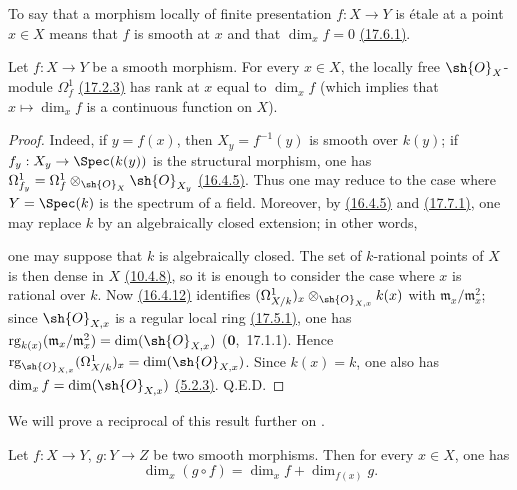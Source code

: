 To say that a morphism locally of finite presentation $f:X\to Y$ is \'etale at a point $x\in X$ means that $f$ is smooth at $x$ and that $\dim_x f=0$ {\hyperlink{ega4.c04.thm.17-6-1}{(17.6.1)}}.

\begin{proposition}[17.10.2]
\label{IV.17.10.2}
Let $f:X\to Y$ be a smooth morphism.
For every $x\in X$, the locally free $\sh{O}_X$-module $\Omega^1_f$ {\hyperlink{ega4.c04.prop.17-2-3}{(17.2.3)}} has rank at $x$ equal to $\dim_x f$ (which implies that $x\mapsto\dim_x f$ is a continuous function on $X$).
\end{proposition}

\begin{proof}
Indeed, if $y=f(x)$, then $X_y=f^{-1}(y)$ is smooth over $k(y)$; if $f_y:X_y\to\Spec(k(y))$ is the structural morphism, one has $\Omega^1_{f_y}=\Omega^1_f\otimes_{\sh{O}_X}\sh{O}_{X_y}$ {\hyperlink{ega4.c04.prop.16-4-5}{(16.4.5)}}.
Thus one may reduce to the case where $Y=\Spec(k)$ is the spectrum of a field.
Moreover, by {\hyperlink{ega4.c04.prop.16-4-5}{(16.4.5)}} and {\hyperlink{ega4.c04.prop.17-7-1}{(17.7.1)}}, one may replace $k$ by an algebraically closed extension; in other words,


one may suppose that $k$ is algebraically closed.
The set of $k$-rational points of $X$ is then dense in $X$ {\hyperlink{ega4.c04.cor.10-4-8}{(10.4.8)}}, so it is enough to consider the case where $x$ is rational over $k$.
Now {\hyperlink{ega4.c04.cor.16-4-12}{(16.4.12)}} identifies $(\Omega^1_{X/k})_x\otimes_{\sh{O}_{X,x}}k(x)$ with $\mathfrak{m}_x/\mathfrak{m}_x^2$; since $\sh{O}_{X,x}$ is a regular local ring {\hyperlink{ega4.c04.thm.17-5-1}{(17.5.1)}}, one has $\operatorname{rg}_{k(x)}(\mathfrak{m}_x/\mathfrak{m}_x^2)=\dim(\sh{O}_{X,x})$ ($\mathbf{0}$,~17.1.1).
Hence $\operatorname{rg}_{\sh{O}_{X,x}}(\Omega^1_{X/k})_x=\dim(\sh{O}_{X,x})$.
Since $k(x)=k$, one also has $\dim_x f=\dim(\sh{O}_{X,x})$ {\hyperlink{ega4.c04.cor.5-2-3}{(5.2.3)}}.
Q.E.D.
\end{proof}

We will prove a reciprocal of this result further on .

\begin{corollary}[17.10.3]
\label{IV.17.10.3}
Let $f:X\to Y$, $g:Y\to Z$ be two smooth morphisms.
Then for every $x\in X$, one has
\[
\label{IV.17.10.3.1}
\tag{17.10.3.1}
\dim_x(g\circ f) = \dim_x f + \dim_{f(x)} g.
\]
\end{corollary}

